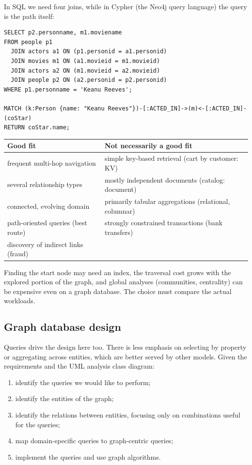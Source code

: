 \begin{example}
In SQL we need four joins, while in Cypher (the Neo4j query language) the query is the path itself:
\begin{lstlisting}
SELECT p2.personname, m1.moviename
FROM people p1
  JOIN actors a1 ON (p1.personid = a1.personid)
  JOIN movies m1 ON (a1.movieid = m1.movieid)
  JOIN actors a2 ON (m1.movieid = a2.movieid)
  JOIN people p2 ON (a2.personid = p2.personid)
WHERE p1.personname = 'Keanu Reeves';

MATCH (k:Person {name: "Keanu Reeves"})-[:ACTED_IN]->(m)<-[:ACTED_IN]-(coStar)
RETURN coStar.name;
\end{lstlisting}
\end{example}

\begin{center}\small
\begin{tabular}{p{6.8cm}p{6.8cm}}
\toprule
\textbf{Good fit} & \textbf{Not necessarily a good fit} \\
\midrule
frequent multi-hop navigation & simple key-based retrieval (cart by customer: KV) \\
several relationship types & mostly independent documents (catalog: document) \\
connected, evolving domain & primarily tabular aggregations (relational, columnar) \\
path-oriented queries (best route) & strongly constrained transactions (bank transfers) \\
discovery of indirect links (fraud) & \\
\bottomrule
\end{tabular}
\end{center}

\begin{remark}
 Finding the start node may need an index, the traversal cost grows with the explored portion of the graph, and global analyses (communities, centrality) can be expensive even on a graph database. The choice must compare the actual workloads.
\end{remark}

\subsection{Graph database design}
Queries drive the design here too. There is less emphasis on selecting by property or aggregating across entities, which are better served by other models. Given the requirements and the UML analysis class diagram:
\begin{enumerate}
  \item identify the queries we would like to perform;
  \item identify the entities of the graph;
  \item identify the relations between entities, focusing only on combinations useful for the queries;
  \item map domain-specific queries to graph-centric queries;
  \item implement the queries and use graph algorithms.
\end{enumerate}

